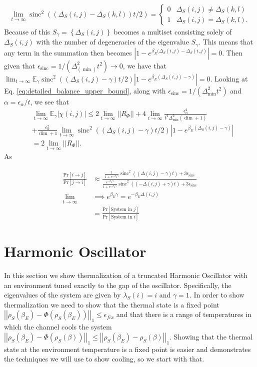 \documentclass{article}
\newcommand{\abs}[1]{\left| #1 \right|}
\newcommand{\norm}[1]{\left| \left| #1 \right| \right|}
\newcommand{\set}[1]{\left\{ #1 \right\}}
\newcommand{\prob}[1]{\text{Pr}\left[ #1 \right]}
\DeclareMathOperator{\sinc}{sinc}
\begin{document}
\begin{align}
    \lim_{t \to \infty} \sinc^2((\Delta_S(i,j) - \Delta_S(k,l)) t/2) = \begin{cases}
        0 & \Delta_S(i,j) \neq \Delta_S(k,l) \\
        1 & \Delta_S(i,j) = \Delta_S(k,l).
    \end{cases}
\end{align}
Because of this $S_{\gamma} = \set{\Delta_S(i,j)}$ becomes a multiset consisting solely of $\Delta_S(i,j)$ with the number of degeneracies of the eigenvalue $S_{\gamma}$. This means that any term in the summation then becomes $\abs{1 - e^{\beta_E(\Delta_S(i,j) - \Delta_S(i,j)}} = 0$. Then given that $\epsilon_{\sinc} = 1/(\Delta_(\min)^2 t^2) \to 0$, we have that $\lim_{t \to \infty} \mathbb{E}_{\gamma} \sinc^2((\Delta_S(i,j) - \gamma)t/2) \abs{1 - e^{\beta_E(\Delta_S(i,j) - \gamma)}} = 0$. Looking at Eq. \eqref{eq:detailed_balance_upper_bound}, along with $\epsilon_{\sinc} = 1/(\Delta_{\min}^2 t^2)$ and $\alpha = \epsilon_{\alpha} / t$, we see that 
\begin{align}
    &\lim_{t \to \infty} \mathbb{E}_{\gamma} \abs{\chi(i,j)} \leq 2 \lim_{t \to \infty} \norm{R_{\Phi}} + 4 \lim_{t \to \infty} \frac{\epsilon_{\alpha}^2}{t^2 \Delta_{\min}^2 (\dim + 1)} \nonumber \\
    &+ \frac{\epsilon_{\alpha}^2}{\dim + 1} \lim_{t \to \infty} \sinc^2((\Delta_S(i,j) - \gamma)t/2) \abs{1 - e^{\beta_E(\Delta_S(i,j) - \gamma)}} \\
    &= 2 \lim_{t \to \infty} \norm{R_{\Phi}}.
\end{align}
As 

\begin{align}
    \frac{\prob{i \to j}}{\prob{j \to i}} &\approx \frac{\frac{1}{1 + e^{-\beta_E \gamma}}\sinc^2 ((\Delta(i,j) - \gamma)t)+ 3 \epsilon_{\sinc}}{\frac{e^{-\beta_E \gamma}}{1 + e^{-\beta_E \gamma}} \sinc^2((-\Delta(i,j) + \gamma)t) + 3 \epsilon_{\sinc}}  \nonumber \\
    \lim_{t \to \infty} &\implies e^{\beta_E \gamma} = e^{-\beta_E \Delta(i,j)} \nonumber \\
    &= \frac{\prob{\text{System in } j}}{ \prob{\text{System in } i}} \nonumber
\end{align}

\section{Harmonic Oscillator}
In this section we show thermalization of a truncated Harmonic Oscillator with an environment tuned exactly to the gap of the oscillator. Specifically, the eigenvalues of the system are given by $\lambda_S(i) = i$ and $\gamma = 1$. In order to show thermalization we need to show that the thermal state is a fixed point $\norm{\rho_S(\beta_E) - \Phi(\rho_S(\beta_E))}_1 \leq \epsilon_{fix}$ and that there is a range of temperatures in which the channel cools the system $\norm{\rho_S(\beta_E) - \Phi(\rho_S(\beta))}_1 \leq \norm{\rho_S(\beta_E) - \rho_S(\beta)}_1$. Showing that the thermal state at the environment temperature is a fixed point is easier and demonstrates the techniques we will use to show cooling, so we start with that.
\end{document}
